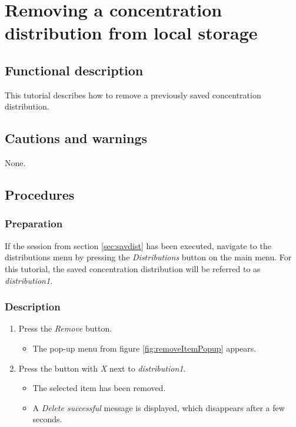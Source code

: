 
\section{Removing a concentration distribution from local storage}\label{sec:remdist}

\subsection{Functional description}
This tutorial describes how to remove a previously saved concentration distribution.

\subsection{Cautions and warnings}
None.

\subsection{Procedures}

\subsubsection{Preparation}
If the session from section \ref{sec:savdist} has been executed, navigate to the distributions menu by pressing the \emph{Distributions} button on the main menu.
For this tutorial, the saved concentration distribution will be referred to as \emph{distribution1}.

\subsubsection{Description}
\begin{enumerate}
	\item Press the \emph{Remove} button.
		\begin{itemize}
			\item The pop-up menu from figure \ref{fig:removeItemPopup} appears.
		\end{itemize}
	\item Press the button with \emph{X} next to \emph{distribution1}.
		\begin{itemize}
			\item The selected item has been removed.
			\item A \emph{Delete successful} message is displayed, which disappears after a few seconds.
		\end{itemize}
\end{enumerate}

